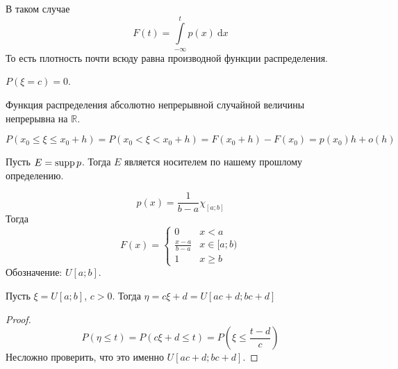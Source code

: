 \documentclass{article}
\begin{document}
    \begin{property}
        В таком случае
        $$F(t)=\int\limits_{-\infty}^tp(x)~\mathrm dx$$
        То есть плотность почти всюду равна производной функции распределения.
    \end{property}
    \begin{property}
        $P(\xi=c)=0$.
    \end{property}
    \begin{property}
        Функция распределения абсолютно непрерывной случайной величины непрерывна на $\mathbb R$.
    \end{property}
    \begin{property}
        $$P(x_0\leqslant\xi\leqslant x_0+h)=P(x_0<\xi<x_0+h)=F(x_0+h)-F(x_0)=p(x_0)h+o(h)$$
    \end{property}
    \begin{property}
        Пусть $E=\operatorname{supp} p$. Тогда $E$ является носителем по нашему прошлому определению.
    \end{property}
    \begin{example}
        $$
        p(x)=\frac1{b-a}\chi_{[a;b]}
        $$
        Тогда
        $$
        F(x)=\begin{cases}
            0 & x<a\\
            \frac{x-a}{b-a} & x\in[a;b)\\
            1 & x\geqslant b
        \end{cases}
        $$
        Обозначение: $U[a;b]$.
    \end{example}
    \begin{claim}
        Пусть $\xi=U[a;b]$, $c>0$. Тогда $\eta=c\xi+d=U[ac+d;bc+d]$
    \end{claim}
    \begin{proof}
        $$
        P(\eta\leqslant t)=P(c\xi+d\leqslant t)=P\left(\xi\leqslant\frac{t-d}c\right)
        $$
        Несложно проверить, что это именно $U[ac+d;bc+d]$.
    \end{proof}
\end{document}
